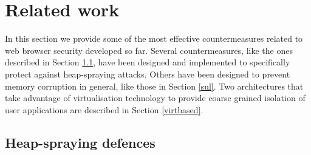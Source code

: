 

\section{Related work}\label{bub:related}
In this section we provide some of the most effective countermeasures related to web browser security developed so far. Several countermeasures, like the ones described in Section \ref{cmnozzle}, have been designed and implemented to specifically protect against heap-spraying attacks. Others have been designed to prevent memory corruption in general, like those in Section \ref{sul}. 
Two architectures that take advantage of virtualisation technology to provide coarse grained isolation of user applications are described in Section \ref{virtbased}. 

\subsection{Heap-spraying defences} \label{cmnozzle}

